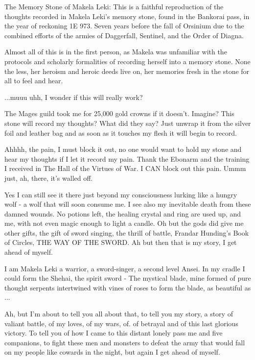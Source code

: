 
 The Memory Stone of Makela Leki: This is a faithful reproduction of the thoughts recorded in Makela Leki's memory stone, found in the Bankorai pass, in the year of reckoning 1E 973. Seven years before the fall of Orsinium due to the combined efforts of the armies of Daggerfall, Sentinel, and the Order of Diagna.

Almost all of this is in the first person, as Makela was unfamiliar with the protocols and scholarly formalities of recording herself into a memory stone. None the less, her heroism and heroic deeds live on, her memories fresh in the stone for all to feel and hear.

\sectionline

...muuu uhh, I wonder if this will really work?

The Mages guild took me for 25,000 gold crowns if it doesn't. Imagine? This stone will record my thoughts? What did they say? Just unwrap it from the silver foil and leather bag and as soon as it touches my flesh it will begin to record.

Ahhhh, the pain, I must block it out, no one would want to hold my stone and hear my thoughts if I let it record my pain. Thank the Ebonarm and the training I received in The Hall of the Virtues of War. I CAN block out this pain. Ummm just, ah, there, it's walled off.

Yes I can still see it there just beyond my consciousness lurking like a hungry wolf - a wolf that will soon consume me. I see also my inevitable death from these damned wounds. No potions left, the healing crystal and ring are used up, and me, with not even magic enough to light a candle. Oh but the gods did give me other gifts, the gift of sword singing, the thrill of battle, Frandar Hunding's Book of Circles, THE WAY OF THE SWORD. Ah but then that is my story, I get ahead of myself.

I am Makela Leki a warrior, a sword-singer, a second level Ansei. In my cradle I could form the Shehai, the spirit sword - The mystical blade, mine formed of pure thought serpents intertwined with vines of roses to form the blade, as beautiful as ...

Ah, but I'm about to tell you all about that, to tell you my story, a story of valiant battle, of my loves, of my wars, of. of betrayal and of this last glorious victory. To tell you of how I came to this distant lonely pass me and five companions, to fight these men and monsters to defeat the army that would fall on my people like cowards in the night, but again I get ahead of myself.

